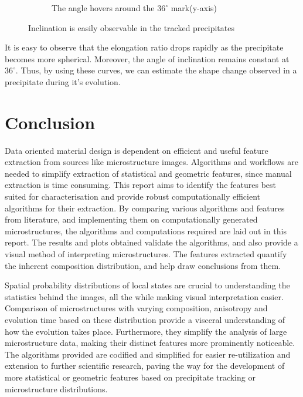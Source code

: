 \documentclass[12pt, a4paper]{report}
\begin{document}
\begin{figure}[H]
\begin{subfigure}{.4\textwidth}
  \caption{The angle hovers around the $36^{\circ}$ mark(y-axis)}
  \label{img:microstrImg}
\end{subfigure}
\caption{Inclination is easily observable in the tracked precipitates}
\label{fig:test}
\end{figure}

It is easy to observe that the elongation ratio drops rapidly as the precipitate becomes more spherical. Moreover, the angle of inclination remains constant at ~$36^{\circ}$. Thus, by using these curves, we can estimate the shape change observed in a precipitate during it's evolution.


\chapter{Conclusion}

Data oriented material design is dependent on efficient and useful feature extraction from sources like microstructure images. Algorithms and workflows are needed to simplify extraction of statistical and geometric features, since manual extraction is time consuming. This report aims to identify the features best suited for characterisation and provide robust computationally efficient algorithms for their extraction. By comparing various algorithms and features from literature, and implementing them on computationally generated microstructures, the algorithms and computations required are laid out in this report. The results and plots obtained validate the algorithms, and also provide a visual method of interpreting microstructures. The features extracted quantify the inherent composition distribution, and help draw conclusions from them. 

Spatial probability distributions of local states are crucial to understanding the statistics behind the images, all the while making visual interpretation easier. Comparison of microstructures with varying composition, anisotropy and evolution time based on these distribution provide a visceral understanding of how the evolution takes place. Furthermore, they simplify the analysis of large microstructure data, making their distinct features more prominently noticeable. The algorithms provided are codified and simplified for easier re-utilization and extension to further scientific research, paving the way for the development of more statistical or geometric features based on precipitate tracking or microstructure distributions.
\end{document}
